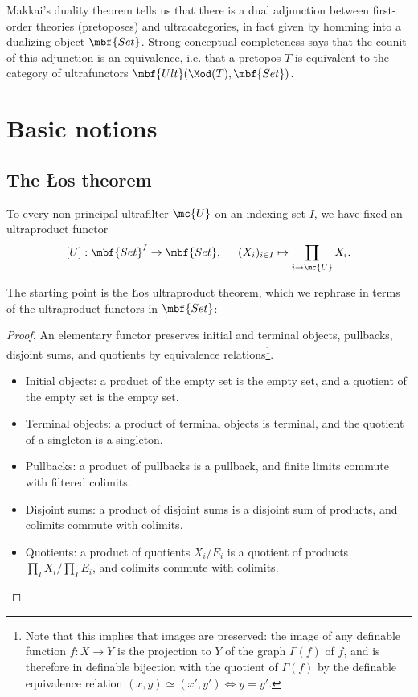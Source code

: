 Makkai's duality theorem \cite{makkai-sdfol} tells us that there is a dual adjunction between first-order theories (pretoposes) and ultracategories, in fact given by homming into a dualizing object $\mbf{Set}$. Strong conceptual completeness says that the counit of this adjunction is an equivalence, i.e. that a pretopos $T$ is equivalent to the category of ultrafunctors $\mbf{Ult}(\Mod(T), \mbf{Set})$.

\section{Basic notions}
\subsection{The {\L}os theorem}
To every non-principal ultrafilter $\mc{U}$ on an indexing set $I$, we have fixed an ultraproduct functor
$$
[U] : \mbf{Set}^I \to \mbf{Set}, \hspace{5mm} (X_i)_{i \in I} \mapsto \prod_{i \to \mc{U}} X_i.
$$

The starting point is the {\L}os ultraproduct theorem, which we rephrase in terms of the ultraproduct functors in $\mbf{Set}$:


\begin{proof}
  An elementary functor preserves initial and terminal objects, pullbacks, disjoint sums, and quotients by equivalence relations\footnote{Note that this implies that images are preserved: the image of any definable function $f : X \to Y$ is the projection to $Y$ of the graph $\Gamma(f)$ of $f$, and is therefore in definable bijection with the quotient of $\Gamma(f)$ by the definable equivalence relation $(x,y) \simeq (x', y') \iff y = y'$.}.
\begin{itemize}
\item  Initial objects: a product of the empty set is the empty set, and a quotient of the empty set is the empty set.

\item  Terminal objects: a product of terminal objects is terminal, and the quotient of a singleton is a singleton.

\item  Pullbacks: a product of pullbacks is a pullback, and finite limits commute with filtered colimits.

\item  Disjoint sums: a product of disjoint sums is a disjoint sum of products, and colimits commute with colimits.

\item  Quotients: a product of quotients $X_i/E_i$ is a quotient of products $\prod_I X_i / \prod_I E_i$, and colimits commute with colimits.
  \end{itemize}
\end{proof}

